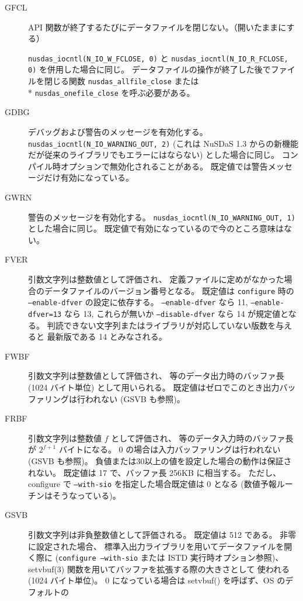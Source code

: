 \begin{description}
\item[GFCL]
 	API 関数が終了するたびにデータファイルを閉じない。（開いたままにする）

	\verb|nusdas_iocntl(N_IO_W_FCLOSE, 0)|
	と
	\verb|nusdas_iocntl(N_IO_R_FCLOSE, 0)|
	を併用した場合に同じ。
	データファイルの操作が終了した後でファイルを閉じる関数
	\verb|nusdas_allfile_close|
	または \\*
	\verb|nusdas_onefile_close|
	を呼ぶ必要がある。
\item[GDBG]
	デバッグおよび警告のメッセージを有効化する。
	\verb|nusdas_iocntl(N_IO_WARNING_OUT, 2)|
	(これは NuSDaS 1.3 からの新機能だが従来のライブラリでもエラーにはならない)
	とした場合に同じ。
	コンパイル時オプションで無効化されることがある。
	既定値では警告メッセージだけ有効になっている。
\item[GWRN]
	警告のメッセージを有効化する。
	\verb|nusdas_iocntl(N_IO_WARNING_OUT, 1)|
	とした場合に同じ。
	既定値で有効になっているので今のところ意味はない。
\item[FVER]
	引数文字列は整数値として評価され、
	定義ファイルに定めがなかった場合のデータファイルのバージョン番号となる。
	既定値は {\tt configure} 時の {\tt --enable-dfver} の設定に依存する。
	{\tt --enable-dfver} なら 11, {\tt --enable-dfver=13} なら 13,
	これらが無いか {\tt --disable-dfver} なら 14 が規定値となる。
	判読できない文字列またはライブラリが対応していない版数を与えると
	最新版である 14 とみなされる。
\item[FWBF]
	引数文字列は整数値として評価され、
	等のデータ出力時のバッファ長 (1024 バイト単位) として用いられる。
	既定値はゼロでこのとき出力バッファリングは行われない (GSVB も参照)。
\item[FRBF]
	引数文字列は整数値 $f$ として評価され、
	等のデータ入力時のバッファ長が $2^{f + 1}$ バイトになる。
        0 の場合は入力バッファリングは行われない (GSVB も参照)。
	負値または30以上の値を設定した場合の動作は保証されない。
	既定値は 17 で、バッファ長 256KB に相当する。
	ただし、configure で {\tt --with-sio} を指定した場合既定値は 0 となる
	(数値予報ルーチンはそうなっている)。
\item[GSVB]
	引数文字列は非負整数値として評価される。
	既定値は 512 である。
	非零に設定された場合、
	標準入出力ライブラリを用いてデータファイルを開く際に
	({\tt configure --with-sio} または ISTD 実行時オプション参照)、
	setvbuf(3) 関数を用いてバッファを拡張する際の大きさとして
	使われる (1024 バイト単位)。
	0 になっている場合は setvbuf() を呼ばず、OS のデフォルトの

\end{description}

